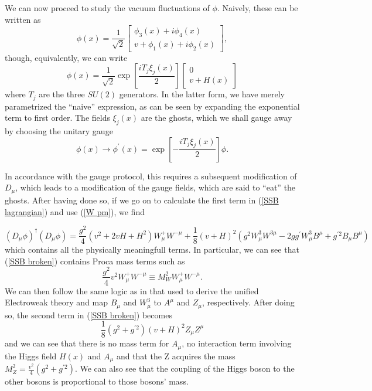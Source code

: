 \documentclass[10pt,a4paper]{book}
\begin{document}
We can now proceed to study the vacuum fluctuations of $\phi$. Naively, these can be written as
\begin{equation}
\phi (x) = \frac{1}{\sqrt{2}}\begin{bmatrix}
\phi_3(x) + i\phi_4(x) \\
v + \phi_1(x) + i\phi_2(x)
\end{bmatrix},
\end{equation}
though, equivalently, we can write
\begin{equation}
\phi (x) = \frac{1}{\sqrt{2}}\exp\left[\frac{iT_j\xi_j(x)}{2} \right]\begin{bmatrix}
0 \\
v + H(x)
\end{bmatrix}
\end{equation}
where $T_j$ are the three $SU(2)$ generators. In the latter form, we have merely parametrized the ``naive'' expression, as can be seen by expanding the exponential term to first order. The fields $\xi_j(x)$ are the ghosts, which we shall gauge away by choosing the unitary gauge
\begin{equation}
\phi (x) \rightarrow \phi^\prime (x) = \exp\left[-\frac{iT_j\xi_j(x)}{2} \right]\phi.
\end{equation}  

In accordance with the gauge protocol, this requires a subsequent modification of $D_\mu$, which leads to a modification of the gauge fields, which are said to ``eat'' the ghosts. After having done so, if we go on to calculate the first term in (\ref{SSB lagrangian}) and use (\ref{W pm}), we find

\begin{equation}
\label{SSB broken}
(D_\mu\phi)^\dagger(D_\mu\phi) = \frac{g^2}{4}\left(v^2 + 2vH + H^2\right)W^+_\mu W^{- \mu} + \frac{1}{8}(v + H)^2 \left( g^2 W^3_\mu W^{3\mu} - 2gg^\prime W^3_\mu B^\mu + g^{\prime 2}B_\mu B^\mu \right)
\end{equation}
which contains all the physically meaningfull terms. In particular, we can see that (\ref{SSB broken}) contains Proca mass terms such as 
\begin{equation}
\frac{g^2}{4}v^2 W_\mu^+ W^{-\mu} \equiv M^2_W W_\mu^+ W^{-\mu}.
\end{equation}
We can then follow the same logic as in that used to derive the unified Electroweak theory and map $B_\mu$ and $W^3_\mu$ to $A^\mu$ and $Z_\mu$, respectively. After doing so, the second term in (\ref{SSB broken}) becomes
\begin{equation}
\frac{1}{8}(g^2 + g^{\prime 2})(v + H)^2 Z_\mu Z^\mu
\end{equation}
and we can see that there is no mass term for $A_\mu$, no interaction term involving the Higgs field $H(x)$ and $A_\mu$ and that the Z acquires the mass $M^2_Z = \frac{v^2}{4}(g^2 + g^{\prime 2})$. We can also see that the coupling of the Higgs boson to the other bosons is proportional to those bosons' mass. 
\end{document}
